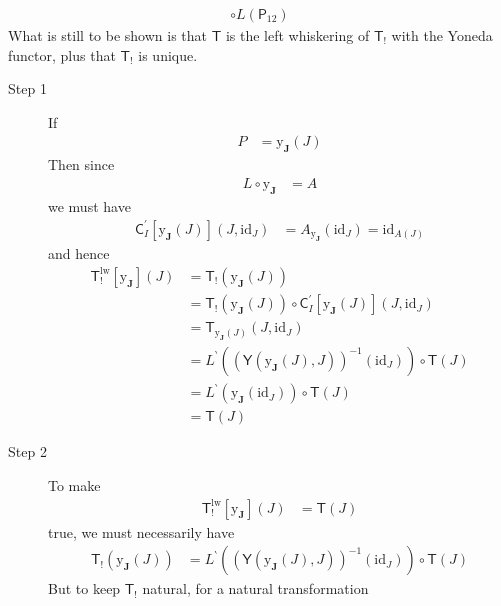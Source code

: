 \begin{prf}
\begin{align*}
  \circ
  L(\mathsf{P}_{12})
\end{align*}
What is still to be shown is that $\mathsf{T}$ is the left whiskering of $\mathsf{T}_{!}$ with the Yoneda functor, plus that $\mathsf{T}_{!}$ is unique.
\begin{description}
\item[Step 1]
If
\begin{align*}
  P
  &=
  \mathrm{y}_{\mathbf{J}}(J)
\end{align*}
Then since
\begin{align*}
  L
  \circ
  \mathrm{y}_{\mathbf{J}}
  &=
  A
\end{align*}
we must have
\begin{align*}
  \mathsf{C}_{I}^{\prime}[\mathrm{y}_{\mathbf{J}}(J)](J,\mathrm{id}_{J})
  &=
  A_{\mathrm{y}_{\mathbf{J}}}(\mathrm{id}_{J})
  =
  \mathrm{id}_{A(J)}
\end{align*}
and hence
\begin{align*}
  \mathsf{T}_{!}^{\textrm{lw}}
  \left[
    \mathrm{y}_{\mathbf{J}}
  \right]
  (J)
  &=
  \mathsf{T}_{!}
  \left(
    \mathrm{y}_{\mathbf{J}}(J)
  \right)
  \\
  &=
  \mathsf{T}_{!}
  \left(
    \mathrm{y}_{\mathbf{J}}(J)
  \right)
  \circ
  \mathsf{C}_{I}^{\prime}[\mathrm{y}_{\mathbf{J}}(J)](J,\mathrm{id}_{J})
  \\
  &=
  \mathsf{T}_{\mathrm{y}_{\mathbf{J}}(J)}(J,\mathrm{id}_{J})
  \\
  &=
  L^{\backprime}
  \left(
    (\mathsf{Y}(\mathrm{y}_{\mathbf{J}}(J),J))^{-1}(\mathrm{id}_{J})
  \right)
  \circ
  \mathsf{T}(J)
  \\
  &=
  L^{\backprime}
  \left(
    \mathrm{y}_{\mathbf{J}}(\mathrm{id}_{J})
  \right)
  \circ
  \mathsf{T}(J)
  \\
  &=
  \mathsf{T}(J)
\end{align*}
\item[Step 2]
To make
\begin{align*}
  \mathsf{T}_{!}^{\textrm{lw}}
  \left[
    \mathrm{y}_{\mathbf{J}}
  \right]
  (J)
  &=
  \mathsf{T}(J)
\end{align*}
true, we must necessarily have
\begin{align*}
  \mathsf{T}_{!}
  \left(
    \mathrm{y}_{\mathbf{J}}(J)
  \right)
  &=
  L^{\backprime}
  \left(
    (\mathsf{Y}(\mathrm{y}_{\mathbf{J}}(J),J))^{-1}(\mathrm{id}_{J})
  \right)
  \circ
  \mathsf{T}(J)
\end{align*}
But to keep $\mathsf{T}_{!}$ natural, for a natural transformation

\end{description}
\end{prf}
